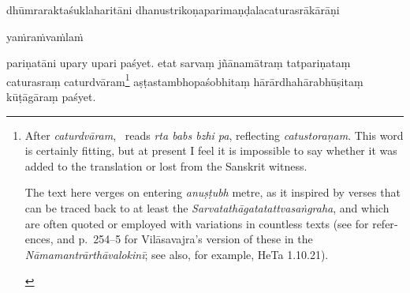 \documentclass[naipra.tex]{subfiles}
\begin{document}
\begin{sanskrit}
{\begin{english}
\end{english}} dhūmraraktaśuklaharitāni dhanustrikoṇaparimaṇḍalacaturasrākārāṇi \begin{mantra}yaṁ\dsh raṁ\dsh vaṁ\dsh laṁ\dsh \end{mantra}pariṇatāni upary upari paśyet. 
etat sarvaṃ jñānamātraṃ  tatpariṇataṃ caturasraṃ caturdvāram\footnote{\begin{english}
	After \emph{caturdvāram}, \TIB\ reads \emph{rta babs bzhi pa}, reflecting \emph{catustoraṇam}.
	This word is certainly fitting, but at present I feel it is impossible to say whether it was added to the translation or lost from the Sanskrit witness.

	The text here verges on entering \emph{anuṣṭubh} metre, as it inspired by verses that can be traced back to at least the \emph{Sarvatathāgatatattvasaṅgraha}, and which are often quoted or employed with variations in countless texts (see \cite[143 n.\ 24]{tribe2016} for references, and p.\ 254–5 for Vilāsavajra's version of these in the \emph{Nāmamantrārthāvalokinī}; see also, for example, HeTa 1.10.21).
\end{english}} aṣṭastambhopaśobhitaṃ hārārdhahārabhūṣitaṃ kūṭāgāraṃ paśyet. 
\pend




\end{sanskrit}
\end{document}

